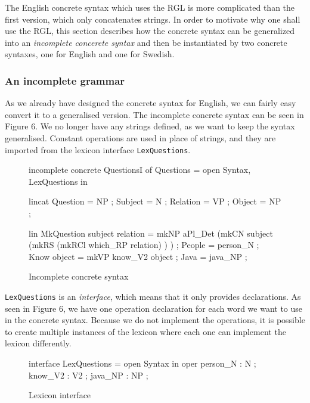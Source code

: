 The English concrete syntax which uses the RGL is more complicated than the first version, which only concatenates strings. In order to motivate why one shall use the RGL, this section describes how the concrete syntax can be generalized into an \emph{incomplete concerete syntax} and then be instantiated by two concrete syntaxes, one for English and one for Swedish.

\subsubsection*{An incomplete grammar}

As we already have designed the concrete syntax for English, we can fairly easy convert it to a generalised version. The incomplete concrete syntax can be seen in Figure 6. We no longer have any strings defined, as we want to keep the syntax generalised. Constant operations are used in place of strings, and they are imported from the lexicon interface  \texttt{LexQuestions}.

\begin{figure}[h]
\begin{code}
incomplete concrete QuestionsI of Questions = open Syntax, LexQuestions in {
    lincat
      Question = NP ;
      Subject = N ;
      Relation = VP ;
      Object = NP ;

    lin
      MkQuestion subject relation = mkNP aPl_Det 
                                        (mkCN subject 
                                            (mkRS 
                                                (mkRCl which_RP relation)
                                            )
                                        ) ;
      People = person_N ;
      Know object = mkVP know_V2 object ;
      Java = java_NP ;
}
\end{code}
\caption{Incomplete concrete syntax}
\end{figure}

\texttt{LexQuestions} is an \emph{interface}, which means that it only provides declarations. As seen in Figure 6, we have one operation declaration for each word we want to use in the concrete syntax. Because we do not implement the operations, it is possible to create multiple instances of the lexicon where each one can implement the lexicon differently.

\begin{figure}[h]
\begin{code}
interface LexQuestions = open Syntax in {
   oper
     person_N : N ;
     know_V2 : V2 ;
     java_NP : NP ;
}
\end{code}
\caption{Lexicon interface}
\end{figure}

